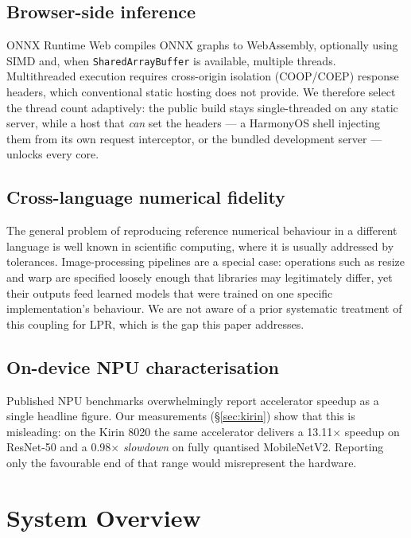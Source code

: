 \documentclass[journal]{IEEEtran}
\begin{document}
\subsection{Browser-side inference}
ONNX Runtime Web \cite{ortweb} compiles ONNX graphs to WebAssembly, optionally
using SIMD and, when \texttt{SharedArrayBuffer} is available, multiple threads.
Multithreaded execution requires cross-origin isolation (COOP/COEP) response
headers, which conventional static hosting does not provide. We therefore select
the thread count adaptively: the public build stays single-threaded on any static
server, while a host that \emph{can} set the headers --- a HarmonyOS shell
injecting them from its own request interceptor, or the bundled development
server --- unlocks every core.

\subsection{Cross-language numerical fidelity}
The general problem of reproducing reference numerical behaviour in a different
language is well known in scientific computing, where it is usually addressed by
tolerances. Image-processing pipelines are a special case: operations such as
resize and warp are specified loosely enough that libraries may legitimately
differ, yet their outputs feed learned models that were trained on one specific
implementation's behaviour. We are not aware of a prior systematic treatment of
this coupling for LPR, which is the gap this paper addresses.

\subsection{On-device NPU characterisation}
Published NPU benchmarks overwhelmingly report accelerator speedup as a single
headline figure. Our measurements (\S\ref{sec:kirin}) show that this is
misleading: on the Kirin 8020 the same accelerator delivers a 13.11$\times$
speedup on ResNet-50 and a 0.98$\times$ \emph{slowdown} on fully quantised
MobileNetV2. Reporting only the favourable end of that range would misrepresent
the hardware.

\section{System Overview}
\end{document}
